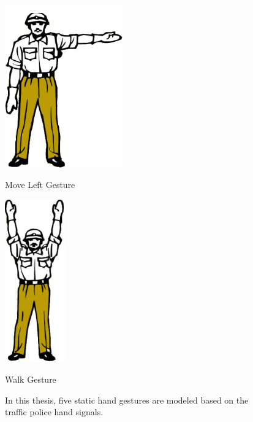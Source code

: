 \begin{figure}
\begin{minipage}
	\end{minipage}
	\begin{minipage}
		{.45 
			\textwidth} \centering 
		\includegraphics[height=7cm]{figures/content/ges-move-left.jpg} \caption{Move Left Gesture} \label{fg:ges:4} 
	\end{minipage}
	\begin{minipage}
		{.45 
		\textwidth} \centering 
		\includegraphics[height=7cm]{figures/content/ges-walk.jpg} \caption{Walk Gesture} \label{fg:ges:1} 
	\end{minipage}	

	\caption{In this thesis, five static hand gestures are modeled based on the traffic police hand signals. \cite{hand-signal} }
	\label{fg:ges:hands} 
\end{figure}

